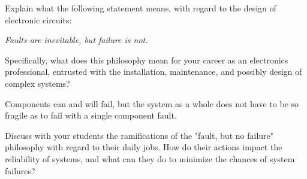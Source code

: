 

Explain what the following statement means, with regard to the design of electronic circuits:

\vskip 10pt {\narrower \noindent \baselineskip5pt
\hskip 20pt {\it Faults are inevitable, but failure is not.}
\par} \vskip 10pt

Specifically, what does this philosophy mean for your career as an electronics professional, entrusted with the installation, maintenance, and possibly design of complex systems?







Components can and will fail, but the system as a whole does not have to be so fragile as to fail with a single component fault.







Discuss with your students the ramifications of the "fault, but no failure" philosophy with regard to their daily jobs.  How do their actions impact the reliability of systems, and what can they do to minimize the chances of system failures?



